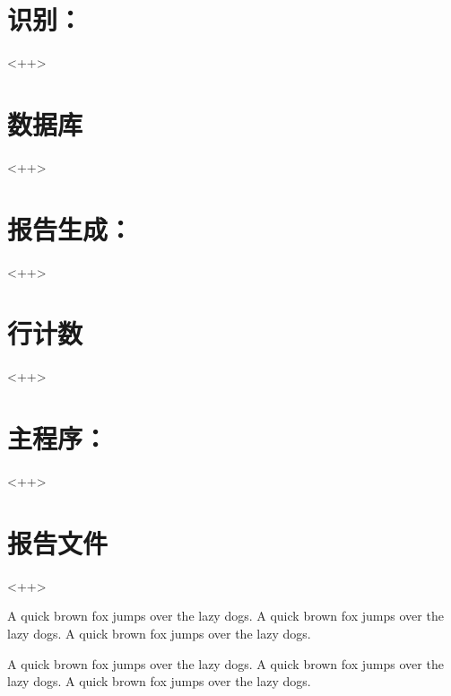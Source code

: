 \section{识别：}
<++>

\section{数据库}
<++>

\section{报告生成：}
<++>

\section{行计数}
<++>

\section{主程序：}
<++>

\section{报告文件}
<++>

A quick brown fox jumps over the lazy dogs.
A quick brown fox jumps over the lazy dogs.
A quick brown fox jumps over the lazy dogs.

A quick brown fox jumps over the lazy dogs.
A quick brown fox jumps over the lazy dogs.
A quick brown fox jumps over the lazy dogs.

